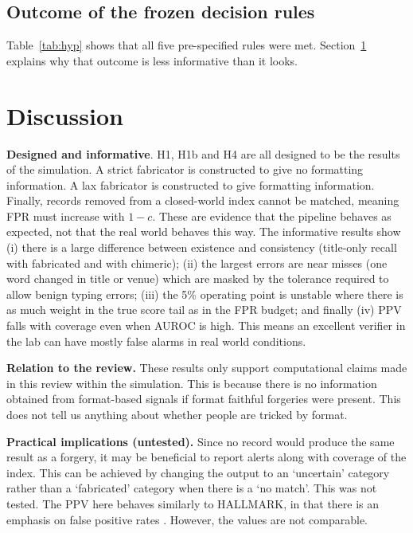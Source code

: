 \subsection{Outcome of the frozen decision rules}
Table~\ref{tab:hyp} shows that all five pre-specified rules were met. Section~\ref{sec:discussion} explains why that outcome is less informative than it looks.

\begin{table}[t]
\caption{Frozen decision rules and outcomes (mean over 5 seeds).}
\label{tab:hyp}
\centering\footnotesize
\resizebox{\columnwidth}{!}{}
\end{table}

\section{Discussion}\label{sec:discussion}
\textbf{Designed and informative}. H1, H1b and H4 are all designed to be the results of the simulation. A strict fabricator is
constructed to give no formatting information. A lax fabricator is constructed to give formatting information. Finally, records removed from
a closed-world index cannot be matched, meaning FPR must increase with $1-c$. These are evidence that the pipeline behaves as expected, not that the real world behaves this way. The informative results show (i) there is a large difference between existence and consistency (title-only recall \NVthreeFone{} with fabricated and \NVthreeFtwo{} with chimeric); (ii) the largest errors are near misses (one word changed in title or venue) which are masked by the tolerance required to allow benign typing errors; (iii) the 5\% operating point is unstable where there is as much weight in the true score tail as in the FPR budget; and finally (iv) PPV falls with coverage even when AUROC is high. This means an excellent verifier in the lab can have mostly false alarms in real world conditions.


\textbf{Relation to the review.} These results only support computational claims made in this review within the simulation. This is because there is no information obtained from format-based signals if format faithful forgeries were present. This does not tell us anything about whether people are tricked by format.

\textbf{Practical implications (untested).} Since no record would produce the same result as a forgery, it may be beneficial to report alerts along with coverage of the index. This can be achieved by changing the output to an `uncertain' category rather than a `fabricated' category when there is a `no match'. This was not tested. The PPV here behaves similarly to HALLMARK, in that there is an emphasis on false positive rates \cite{reizinger2026}. However, the values are not comparable.


